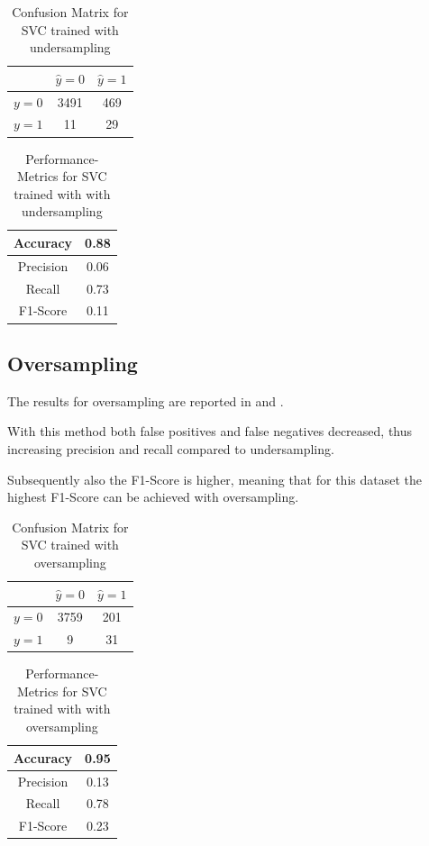 \documentclass[12pt,a4paper]{scrartcl}
\begin{document}
	\begin{table}[H]
		\centering
		\begin{tabular}{c|c|c|}
			& $\hat{y}=0$ & $\hat{y}=1$ \\ \hline
			$y=0$ & 3491      & 469         \\ \hline
			$y=1$ & 11        & 29         \\ \hline
		\end{tabular}
		\caption{Confusion Matrix for SVC trained with undersampling}
		\label{tab:ex2_3_conf_m2}
	\end{table}

	\begin{table}[H]
		\centering
		\begin{tabular}{|c|c|}
			\hline
			Accuracy  & 0.88 \\ \hline
			Precision & 0.06 \\ \hline
			Recall    & 0.73 \\ \hline
			F1-Score  & 0.11 \\ \hline
		\end{tabular}
		\caption{Performance-Metrics for SVC trained with with undersampling}
		\label{tab:ex2_3_perf2}
	\end{table}

	\subsection*{Oversampling}
	The results for oversampling are reported in  and .
	
	With this method both false positives and false negatives decreased, thus increasing precision and recall compared to undersampling.
	
	Subsequently also the F1-Score is higher, meaning that for this dataset the highest F1-Score can be achieved with oversampling.
	
	
	\begin{table}[H]
		\centering
		\begin{tabular}{c|c|c|}
			& $\hat{y}=0$ & $\hat{y}=1$ \\ \hline
			$y=0$ & 3759      & 201         \\ \hline
			$y=1$ & 9        & 31         \\ \hline
		\end{tabular}
		\caption{Confusion Matrix for SVC trained with oversampling}
		\label{tab:ex2_3_conf_m3}
	\end{table}

	\begin{table}[H]
		\centering
		\begin{tabular}{|c|c|}
			\hline
			Accuracy  & 0.95 \\ \hline
			Precision & 0.13 \\ \hline
			Recall    & 0.78 \\ \hline
			F1-Score  & 0.23 \\ \hline
		\end{tabular}
		\caption{Performance-Metrics for SVC trained with with oversampling}
		\label{tab:ex2_3_perf3}
	\end{table}

	
	
\end{document}
